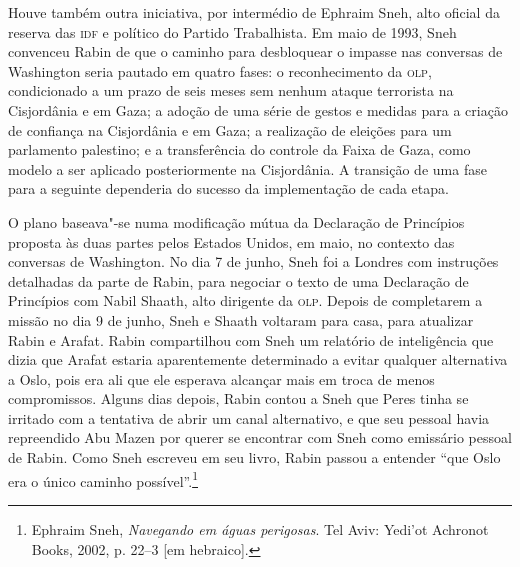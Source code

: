 Houve também outra iniciativa, por intermédio de Ephraim Sneh, alto
oficial da reserva das \textsc{idf} e político do Partido Trabalhista. Em maio de
1993, Sneh convenceu Rabin de que o caminho para desbloquear o impasse
nas conversas de Washington seria pautado em quatro fases: o
reconhecimento da \textsc{olp}, condicionado a um prazo de seis meses sem nenhum
ataque terrorista na Cisjordânia e em Gaza; a adoção de uma série de
gestos e medidas para a criação de confiança na Cisjordânia e em Gaza; a
realização de eleições para um parlamento palestino; e a transferência
do controle da Faixa de Gaza, como modelo a ser aplicado posteriormente
na Cisjordânia. A transição de uma fase para a seguinte dependeria
do sucesso da implementação de cada etapa.

O plano baseava"-se numa modificação mútua da Declaração de Princípios
proposta às duas partes pelos Estados Unidos, em maio, no contexto das
conversas de Washington. No dia 7 de junho, Sneh foi a Londres com
instruções detalhadas da parte de Rabin, para negociar o texto de uma
Declaração de Princípios com Nabil Shaath, alto dirigente da \textsc{olp}. Depois
de completarem a missão no dia 9 de junho, Sneh e Shaath voltaram para
casa, para atualizar Rabin e Arafat. Rabin compartilhou com Sneh um
relatório de inteligência que dizia que Arafat estaria aparentemente
determinado a evitar qualquer alternativa a Oslo, pois era ali que ele
esperava alcançar mais em troca de menos compromissos. Alguns dias
depois, Rabin contou a Sneh que Peres tinha se irritado com a
tentativa de abrir um canal alternativo, e que seu pessoal havia
repreendido Abu Mazen por querer se encontrar com Sneh como emissário
pessoal de Rabin. Como Sneh escreveu em seu livro, Rabin passou a
entender ``que Oslo era o único caminho possível''.\footnote{Ephraim
  Sneh, \textit{Navegando em águas perigosas}. Tel Aviv: Yedi'ot Achronot Books, 2002, p. 22--3
  {[}em hebraico{]}.}

